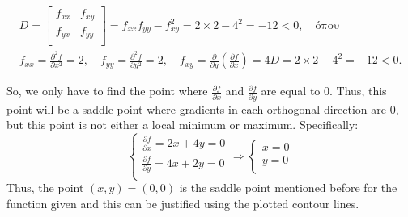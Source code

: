 \begin{equation}
\begin{gathered}
D =
\left[
\begin{array}{cc}
	f_{xx} & f_{xy} \\
	f_{yx} & f_{yy} \\
\end{array}
\right]
= f_{xx} f_{yy} - f^2_{xy} = 2 \times 2 - 4^2 = -12 < 0, \quad \text{όπου} \\
f_{xx} = \frac{\partial^2 f}{\partial x^2} = 2, \quad
f_{yy} = \frac{\partial^2 f}{\partial y^2} = 2, \quad
f_{xy} = \frac{\partial}{\partial y} \left( \frac{\partial f}{\partial x} \right) = 4
D = 2 \times 2 - 4^2 = -12 < 0.
\end{gathered}
\end{equation}

So, we only have to find the point where $\frac{\partial f}{\partial x}$ and $\frac{\partial f}{\partial y}$ are equal to $0$. Thus, this point will be a saddle point where gradients in each orthogonal direction are $0$, but this point is not either a local minimum or maximum.
Specifically:
\begin{equation}
\left\{
\begin{array}{c}
	\frac{\partial f}{\partial x} = 2x + 4y = 0 \\ 
	\frac{\partial f}{\partial y} = 4x + 2y = 0 \\
\end{array}
\right.
\Rightarrow
\left\{
\begin{array}{c}
	x = 0\\y=0\\
\end{array}
\right.
\end{equation}
Thus, the point $(x,y) = (0,0)$ is the saddle point mentioned before for the function given and this can be justified using the plotted contour lines.